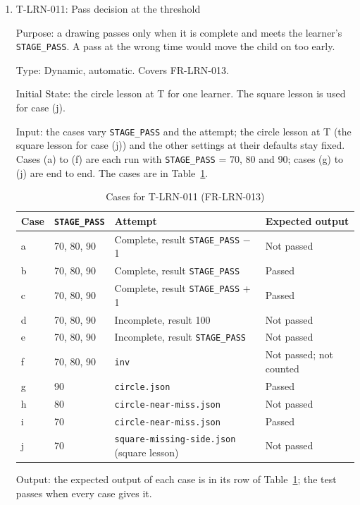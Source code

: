 \documentclass[12pt, titlepage]{article}
\newcommand{\testitem}[1]{\item #1\par\nopagebreak}
\begin{document}
\begin{enumerate}
\testitem{T-LRN-011: Pass decision at the threshold}

Purpose: a drawing passes only when it is complete and meets the learner's
\texttt{STAGE\_PASS}. A pass at the wrong time would move the child on too
early.

Type: Dynamic, automatic. Covers FR-LRN-013.

Initial State: the circle lesson at T for one learner. The square lesson is
used for case (j).

Input: the cases vary \texttt{STAGE\_PASS} and the attempt; the circle
lesson at T (the square lesson for case (j)) and the other settings at
their defaults stay fixed. Cases (a) to (f) are each run with
\texttt{STAGE\_PASS} = 70, 80 and 90; cases (g) to (j) are end to end. The
cases are in Table~\ref{tab:t-lrn-011}.

\begin{table}[htbp]
\centering\small
\caption{Cases for T-LRN-011 (FR-LRN-013)}
\label{tab:t-lrn-011}
\begin{tabularx}{\textwidth}{@{}l l >{\raggedright\arraybackslash}X
  >{\raggedright\arraybackslash}X@{}}
\toprule
\textbf{Case} & \textbf{\texttt{STAGE\_PASS}} & \textbf{Attempt} &
\textbf{Expected output}\\
\midrule
a & 70, 80, 90 & Complete, result \texttt{STAGE\_PASS} $-$ 1 & Not
passed\\
b & 70, 80, 90 & Complete, result \texttt{STAGE\_PASS} & Passed\\
c & 70, 80, 90 & Complete, result \texttt{STAGE\_PASS} + 1 & Passed\\
d & 70, 80, 90 & Incomplete, result 100 & Not passed\\
e & 70, 80, 90 & Incomplete, result \texttt{STAGE\_PASS} & Not passed\\
f & 70, 80, 90 & \texttt{inv} & Not passed; not counted\\
g & 90 & \texttt{circle.json} & Passed\\
h & 80 & \texttt{circle-\allowbreak{}near-\allowbreak{}miss.json} & Not
passed\\
i & 70 & \texttt{circle-\allowbreak{}near-\allowbreak{}miss.json} &
Passed\\
j & 70 & \texttt{square-\allowbreak{}missing-\allowbreak{}side.json}
(square lesson) & Not passed\\
\bottomrule
\end{tabularx}
\end{table}

Output: the expected output of each case is in its row of
Table~\ref{tab:t-lrn-011}; the test passes when every case gives it.


\end{enumerate}
\end{document}
